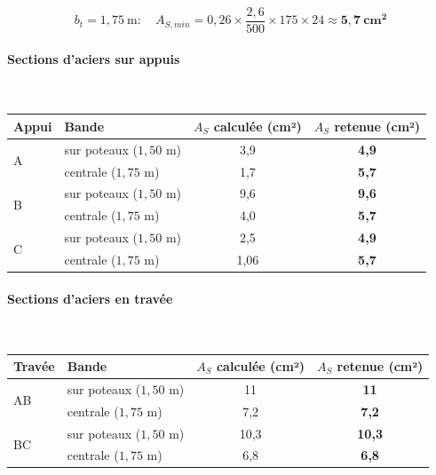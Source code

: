 \[
b_t = 1{,}75~\text{m} : \quad A_{S,min} = 0{,}26 \times \frac{2{,}6}{500} \times 175 \times 24 \approx \mathbf{5{,}7~\text{cm}^2}
\]

\paragraph{Sections d'aciers sur appuis}~

\begin{center}
\begin{tabularx}{0.95\linewidth}{XXcc}
\toprule
\textbf{Appui} & \textbf{Bande} & \textbf{$A_S$ calculée (cm²)} & \textbf{$A_S$ retenue (cm²)} \\
\midrule
\multirow{2}{*}{A} & sur poteaux ($1{,}50$ m) & 3{,}9  & \textbf{4{,}9} \\
                   & centrale ($1{,}75$ m)    & 1{,}7  & \textbf{5{,}7} \\
\midrule
\multirow{2}{*}{B} & sur poteaux ($1{,}50$ m) & 9{,}6  & \textbf{9{,}6} \\
                   & centrale ($1{,}75$ m)    & 4{,}0  & \textbf{5{,}7} \\
\midrule
\multirow{2}{*}{C} & sur poteaux ($1{,}50$ m) & 2{,}5  & \textbf{4{,}9} \\
                   & centrale ($1{,}75$ m)    & 1{,}06 & \textbf{5{,}7} \\
\bottomrule
\end{tabularx}
\end{center}

\paragraph{Sections d'aciers en travée}~

\begin{center}
\begin{tabularx}{0.95\linewidth}{XXcc}
\toprule
\textbf{Travée} & \textbf{Bande} & \textbf{$A_S$ calculée (cm²)} & \textbf{$A_S$ retenue (cm²)} \\
\midrule
\multirow{2}{*}{AB} & sur poteaux ($1{,}50$ m) & 11    & \textbf{11}    \\
                    & centrale ($1{,}75$ m)    & 7{,}2 & \textbf{7{,}2} \\
\midrule
\multirow{2}{*}{BC} & sur poteaux ($1{,}50$ m) & 10{,}3 & \textbf{10{,}3} \\
                    & centrale ($1{,}75$ m)    & 6{,}8  & \textbf{6{,}8}  \\
\bottomrule
\end{tabularx}
\end{center}

